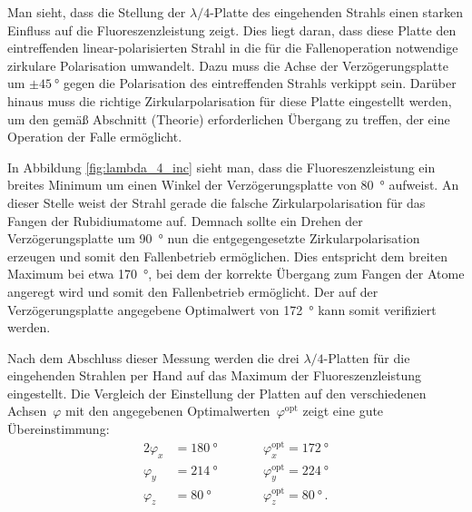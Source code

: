 \documentclass[11pt, a4paper]{article}
\numberwithin{equation}{section}
\newcommand{\korr}[1]{{\color{red}(#1)}}
\begin{document}
Man sieht, dass die Stellung der $\lambda / 4$-Platte des eingehenden Strahls einen starken Einfluss auf die Fluoreszenzleistung zeigt.
Dies liegt daran, dass diese Platte den eintreffenden linear-polarisierten Strahl in die für die Fallenoperation notwendige zirkulare Polarisation umwandelt.
Dazu muss die Achse der Verzögerungsplatte um $\pm\SI{45}{\degree}$ gegen die Polarisation des eintreffenden Strahls verkippt sein.
Darüber hinaus muss die richtige Zirkularpolarisation für diese Platte eingestellt werden, um den gemäß Abschnitt \korr{Theorie} erforderlichen Übergang zu treffen, der eine Operation der Falle ermöglicht.

In Abbildung \ref{fig:lambda_4_inc} sieht man, dass die Fluoreszenzleistung ein breites Minimum um einen Winkel der Verzögerungsplatte von \SI{80}{\degree} aufweist.
An dieser Stelle weist der Strahl gerade die falsche Zirkularpolarisation für das Fangen der Rubidiumatome auf.
Demnach sollte ein Drehen der Verzögerungsplatte um \SI{90}{\degree} nun die entgegengesetzte Zirkularpolarisation erzeugen und somit den Fallenbetrieb ermöglichen.
Dies entspricht dem breiten Maximum bei etwa \SI{170}{\degree}, bei dem der korrekte Übergang zum Fangen der Atome angeregt wird und somit den Fallenbetrieb ermöglicht.
Der auf der Verzögerungsplatte angegebene Optimalwert von \SI{172}{\degree} kann somit verifiziert werden.

Nach dem Abschluss dieser Messung werden die drei $\lambda / 4$-Platten für die eingehenden Strahlen per Hand auf das Maximum der Fluoreszenzleistung eingestellt.
Die Vergleich der Einstellung der Platten auf den verschiedenen Achsen~$\varphi$ mit den angegebenen Optimalwerten~$\varphi^\mathrm{opt}$ zeigt eine gute Übereinstimmung:
\begin{alignat*}{2}
\varphi_x &= \SI{180}{\degree} \qquad &&\varphi_x^\mathrm{opt} = \SI{172}{\degree}\\
\varphi_y &= \SI{214}{\degree} \qquad &&\varphi_y^\mathrm{opt} = \SI{224}{\degree}\\
\varphi_z &= \SI{80}{\degree} \qquad &&\varphi_z^\mathrm{opt} = \SI{80}{\degree} \, \text{.}
\end{alignat*}
\end{document}
